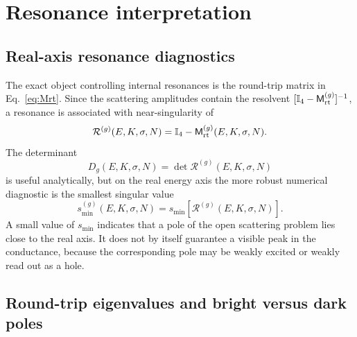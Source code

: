 \section{Resonance interpretation}
\label{sec:resonances}

\subsection{Real-axis resonance diagnostics}
\label{subsec:real-axis-diagnostics}

The exact object controlling internal resonances is the round-trip matrix in Eq.~\eqref{eq:Mrt}.  Since the scattering amplitudes contain the resolvent $[\mathbb I_4-\mathsf M_{\mathrm{rt}}^{(g)}]^{-1}$, a resonance is associated with near-singularity of
\begin{equation}
    \mathcal R^{(g)}(E,K,\sigma,N)
    =
    \mathbb I_4-
    \mathsf M_{\mathrm{rt}}^{(g)}(E,K,\sigma,N).
    \label{eq:resolvent-denominator}
\end{equation}
The determinant
\begin{equation}
    D_g(E,K,\sigma,N)
    =
    \det\mathcal R^{(g)}(E,K,\sigma,N)
    \label{eq:det-diagnostic}
\end{equation}
is useful analytically, but on the real energy axis the more robust numerical diagnostic is the smallest singular value
\begin{equation}
    s_{\min}^{(g)}(E,K,\sigma,N)
    =
    s_{\min}\!\left[\mathcal R^{(g)}(E,K,\sigma,N)\right].
    \label{eq:smin-diagnostic}
\end{equation}
A small value of $s_{\min}$ indicates that a pole of the open scattering problem lies close to the real axis.  It does not by itself guarantee a visible peak in the conductance, because the corresponding pole may be weakly excited or weakly read out as a hole.

\subsection{Round-trip eigenvalues and bright versus dark poles}
\label{subsec:bright-dark-poles}

